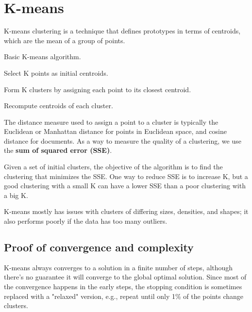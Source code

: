 \section{K-means}

K-means clustering is a technique that defines prototypes in terms of centroids, which are the mean of a group of points.

\begin{algorithm}
\caption{Basic K-means algorithm.}
\begin{algorithmic}[1]
    \State Select K points as initial centroids.

    \Repeat
        \State Form K clusters by assigning each point to its closest centroid.

        \State Recompute centroids of each cluster.
\end{algorithmic}
\end{algorithm}

The distance measure used to assign a point to a cluster is typically the Euclidean or Manhattan distance for points in Euclidean space, and cosine distance for documents. As a way to measure the quality of a clustering, we use the \textbf{sum of squared error (SSE)}.


Given a set of initial clusters, the objective of the algorithm is to find the clustering that minimizes the SSE. One way to reduce SSE is to increase K, but a good clustering with a small K can have a lower SSE than a poor clustering with a big K.

K-means mostly has issues with clusters of differing sizes, densities, and shapes; it also performs poorly if the data has too many outliers.

\subsection{Proof of convergence and complexity}

K-means always converges to a solution in a finite number of steps, although there's no guarantee it will converge to the global optimal solution. Since most of the convergence happens in the early steps, the stopping condition is sometimes replaced with a "relaxed" version, e.g., repeat until only 1\% of the points change clusters.

